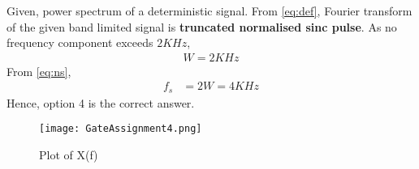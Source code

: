 \documentclass[journal,12pt,twocolumn]{IEEEtran}
\begin{document}
Given, power spectrum of a deterministic signal. From \eqref{eq:def}, Fourier transform of the given band limited signal is \textbf{truncated normalised sinc pulse}. As no frequency component exceeds $2 KHz$,
\begin{align}
    W=2 KHz
\end{align}
From \eqref{eq:ns}, 
\begin{align}
    f_s&=2W=4 KHz
\end{align}
Hence, option 4 is the correct answer.
\begin{figure}[!h]
 \centering
 \texttt{[image: GateAssignment4.png]}
 \caption{Plot of X(f)}
 \label{plot}
\end{figure}
\end{document}
